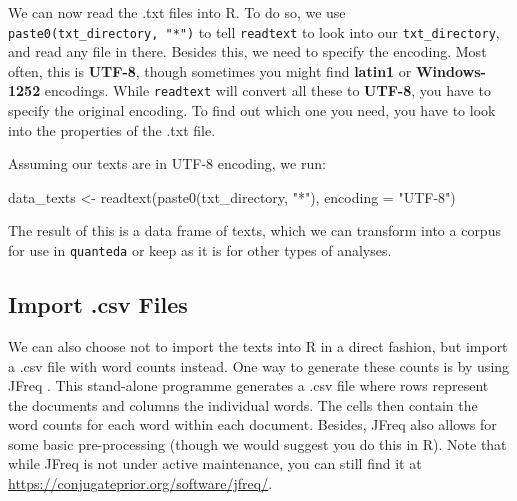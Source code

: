\documentclass[
]{article}
\newenvironment{Shaded}{\begin{snugshade}}{\end{snugshade}}
\newcommand{\AttributeTok}[1]{\textcolor[rgb]{0.77,0.63,0.00}{#1}}
\newcommand{\FunctionTok}[1]{\textcolor[rgb]{0.00,0.00,0.00}{#1}}
\newcommand{\NormalTok}[1]{#1}
\newcommand{\OtherTok}[1]{\textcolor[rgb]{0.56,0.35,0.01}{#1}}
\newcommand{\StringTok}[1]{\textcolor[rgb]{0.31,0.60,0.02}{#1}}
\begin{document}
We can now read the .txt files into R. To do so, we use \texttt{paste0(txt\_directory,\ "*")} to tell \texttt{readtext} to look into our \texttt{txt\_directory}, and read any file in there. Besides this, we need to specify the encoding. Most often, this is \textbf{UTF-8}, though sometimes you might find \textbf{latin1} or \textbf{Windows-1252} encodings. While \texttt{readtext} will convert all these to \textbf{UTF-8}, you have to specify the original encoding. To find out which one you need, you have to look into the properties of the .txt file.

Assuming our texts are in UTF-8 encoding, we run:

\begin{Shaded}
\begin{Highlighting}[]
\NormalTok{data\_texts }\OtherTok{\textless{}{-}} \FunctionTok{readtext}\NormalTok{(}\FunctionTok{paste0}\NormalTok{(txt\_directory, }\StringTok{"*"}\NormalTok{), }\AttributeTok{encoding =} \StringTok{"UTF{-}8"}\NormalTok{)}
\end{Highlighting}
\end{Shaded}

The result of this is a data frame of texts, which we can transform into a corpus for use in \texttt{quanteda} or keep as it is for other types of analyses.

\hypertarget{import-.csv-files}{%
\subsection{Import .csv Files}\label{import-.csv-files}}

We can also choose not to import the texts into R in a direct fashion, but import a .csv file with word counts instead. One way to generate these counts is by using JFreq \autocite{Lowe2011b}. This stand-alone programme generates a .csv file where rows represent the documents and columns the individual words. The cells then contain the word counts for each word within each document. Besides, JFreq also allows for some basic pre-processing (though we would suggest you do this in R). Note that while JFreq is not under active maintenance, you can still find it at \url{https://conjugateprior.org/software/jfreq/}.
\end{document}
